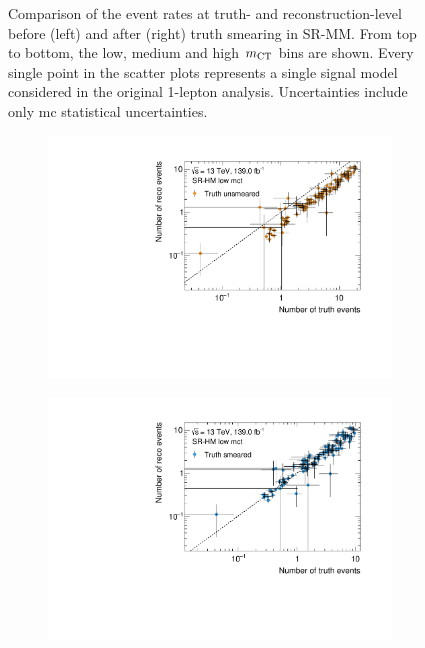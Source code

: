 \begin{figure}
\begin{subfigure}[b]{0.49\linewidth}
	\end{subfigure}
	\caption{Comparison of the event rates at truth- and reconstruction-level before (left) and after (right) truth smearing in SR-MM. From top to bottom, the low, medium and high $m_{\textrm{CT}}$ bins are shown. Every single point in the scatter plots represents a single signal model considered in the original 1-lepton analysis. Uncertainties include only \gls{mc} statistical uncertainties.}
	\label{fig:smearing_signal_regions_2}
\end{figure}

\begin{figure}
	\centering
	\begin{subfigure}[b]{0.49\linewidth}
		\centering\includegraphics[width=\textwidth]{yields_SR-HM_low_mct_unsmeared}
	\end{subfigure}\hfill
	\begin{subfigure}[b]{0.49\linewidth}
		\centering\includegraphics[width=\textwidth]{yields_SR-HM_low_mct_smeared}

\end{subfigure}
\end{figure}
